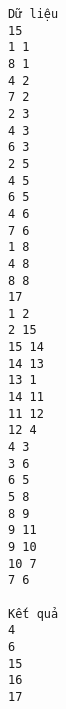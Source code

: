 \begin{verbatim}
Dữ liệu
15
1 1
8 1
4 2
7 2
2 3
4 3
6 3
2 5
4 5
6 5
4 6
7 6
1 8
4 8
8 8
17
1 2
2 15
15 14
14 13
13 1
14 11
11 12
12 4
4 3
3 6
6 5
5 8
8 9
9 11
9 10
10 7
7 6

Kết quả
4
6
15
16
17
\end{verbatim}